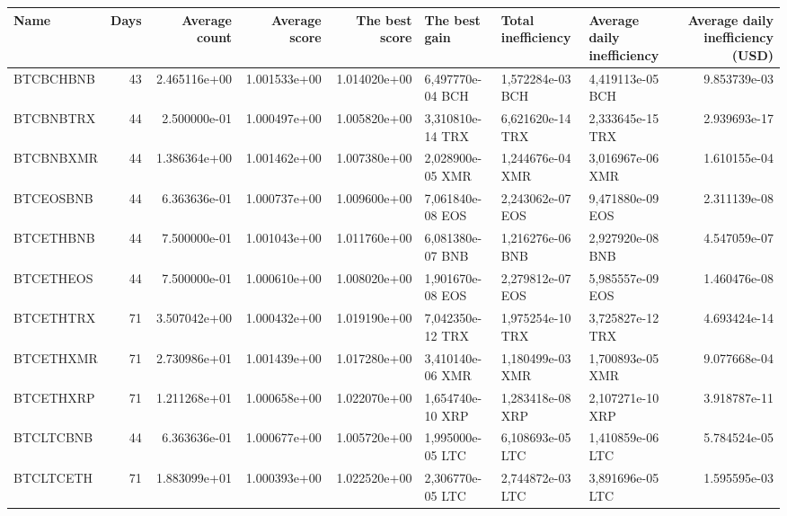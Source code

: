 \begin{tabular}{lrrrrlllr}
\toprule
       Name &  Days &  Average count &  Average score &  The best score &     The best gain & Total inefficiency & Average daily inefficiency &  Average daily inefficiency (USD) \\
\midrule
  BTCBCHBNB &    43 &   2.465116e+00 &   1.001533e+00 &    1.014020e+00 &  6,497770e-04 BCH &   1,572284e-03 BCH &           4,419113e-05 BCH &                      9.853739e-03 \\
  BTCBNBTRX &    44 &   2.500000e-01 &   1.000497e+00 &    1.005820e+00 &  3,310810e-14 TRX &   6,621620e-14 TRX &           2,333645e-15 TRX &                      2.939693e-17 \\
  BTCBNBXMR &    44 &   1.386364e+00 &   1.001462e+00 &    1.007380e+00 &  2,028900e-05 XMR &   1,244676e-04 XMR &           3,016967e-06 XMR &                      1.610155e-04 \\
  BTCEOSBNB &    44 &   6.363636e-01 &   1.000737e+00 &    1.009600e+00 &  7,061840e-08 EOS &   2,243062e-07 EOS &           9,471880e-09 EOS &                      2.311139e-08 \\
  BTCETHBNB &    44 &   7.500000e-01 &   1.001043e+00 &    1.011760e+00 &  6,081380e-07 BNB &   1,216276e-06 BNB &           2,927920e-08 BNB &                      4.547059e-07 \\
  BTCETHEOS &    44 &   7.500000e-01 &   1.000610e+00 &    1.008020e+00 &  1,901670e-08 EOS &   2,279812e-07 EOS &           5,985557e-09 EOS &                      1.460476e-08 \\
  BTCETHTRX &    71 &   3.507042e+00 &   1.000432e+00 &    1.019190e+00 &  7,042350e-12 TRX &   1,975254e-10 TRX &           3,725827e-12 TRX &                      4.693424e-14 \\
  BTCETHXMR &    71 &   2.730986e+01 &   1.001439e+00 &    1.017280e+00 &  3,410140e-06 XMR &   1,180499e-03 XMR &           1,700893e-05 XMR &                      9.077668e-04 \\
  BTCETHXRP &    71 &   1.211268e+01 &   1.000658e+00 &    1.022070e+00 &  1,654740e-10 XRP &   1,283418e-08 XRP &           2,107271e-10 XRP &                      3.918787e-11 \\
  BTCLTCBNB &    44 &   6.363636e-01 &   1.000677e+00 &    1.005720e+00 &  1,995000e-05 LTC &   6,108693e-05 LTC &           1,410859e-06 LTC &                      5.784524e-05 \\
  BTCLTCETH &    71 &   1.883099e+01 &   1.000393e+00 &    1.022520e+00 &  2,306770e-05 LTC &   2,744872e-03 LTC &           3,891696e-05 LTC &                      1.595595e-03 \\

\end{tabular}
